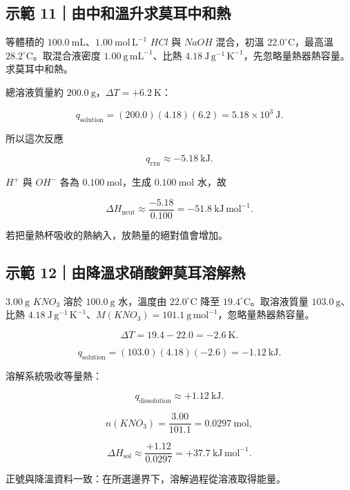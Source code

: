 \documentclass[11pt,a4paper]{article}
\begin{document}
\begin{HandoutWorkedExample}

\subsection{示範 11｜由中和溫升求莫耳中和熱}\label{ux793aux7bc4-11ux7531ux4e2dux548cux6eabux5347ux6c42ux83abux8033ux4e2dux548cux71b1}

等體積的 \(100.0\ \mathrm{mL}\)、\(1.00\ \mathrm{mol\,L^{-1}}\) \(HCl\) 與 \(NaOH\) 混合，初溫 \(22.0^\circ\mathrm C\)，最高溫 \(28.2^\circ\mathrm C\)。取混合液密度 \(1.00\ \mathrm{g\,mL^{-1}}\)、比熱 \(4.18\ \mathrm{J\,g^{-1}\,K^{-1}}\)，先忽略量熱器熱容量。求莫耳中和熱。

總溶液質量約 \(200.0\ \mathrm g\)，\(\Delta T=+6.2\ \mathrm K\)：

\[
q_{\text{solution}}=(200.0)(4.18)(6.2)=5.18\times10^3\ \mathrm J.
\]

所以這次反應

\[
q_{\text{rxn}}\approx-5.18\ \mathrm{kJ}.
\]

\(H^+\) 與 \(OH^-\) 各為 \(0.100\ \mathrm{mol}\)，生成 \(0.100\ \mathrm{mol}\) 水，故

\[
\Delta H_{\text{neut}}\approx
\frac{-5.18}{0.100}
=-51.8\ \mathrm{kJ\,mol^{-1}}.
\]

若把量熱杯吸收的熱納入，放熱量的絕對值會增加。

\end{HandoutWorkedExample}

\begin{HandoutWorkedExample}

\subsection{示範 12｜由降溫求硝酸鉀莫耳溶解熱}\label{ux793aux7bc4-12ux7531ux964dux6eabux6c42ux785dux9178ux9240ux83abux8033ux6eb6ux89e3ux71b1}

\(3.00\ \mathrm g\) \(KNO_3\) 溶於 \(100.0\ \mathrm g\) 水，溫度由 \(22.0^\circ\mathrm C\) 降至 \(19.4^\circ\mathrm C\)。取溶液質量 \(103.0\ \mathrm g\)、比熱 \(4.18\ \mathrm{J\,g^{-1}\,K^{-1}}\)、\(M(KNO_3)=101.1\ \mathrm{g\,mol^{-1}}\)，忽略量熱器熱容量。

\[
\Delta T=19.4-22.0=-2.6\ \mathrm K.
\]

\[
q_{\text{solution}}=(103.0)(4.18)(-2.6)=-1.12\ \mathrm{kJ}.
\]

溶解系統吸收等量熱：

\[
q_{\text{dissolution}}\approx+1.12\ \mathrm{kJ}.
\]

\[
n(KNO_3)=\frac{3.00}{101.1}=0.0297\ \mathrm{mol},
\]

\[
\Delta H_{\text{sol}}\approx\frac{+1.12}{0.0297}
=+37.7\ \mathrm{kJ\,mol^{-1}}.
\]

正號與降溫資料一致：在所選邊界下，溶解過程從溶液取得能量。

\end{HandoutWorkedExample}
\end{document}
